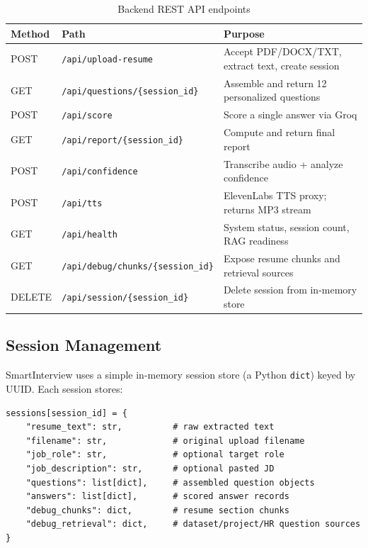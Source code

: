 \documentclass[12pt,a4paper]{article}
\begin{document}
\begin{table}[H]
\centering
\caption{Backend REST API endpoints}
\small
\begin{tabularx}{\textwidth}{l l X}
\toprule
\textbf{Method} & \textbf{Path} & \textbf{Purpose} \\
\midrule
POST & \texttt{/api/upload-resume} & Accept PDF/DOCX/TXT, extract text, create session \\
GET  & \texttt{/api/questions/\{session\_id\}} & Assemble and return 12 personalized questions \\
POST & \texttt{/api/score} & Score a single answer via Groq \\
GET  & \texttt{/api/report/\{session\_id\}} & Compute and return final report \\
POST & \texttt{/api/confidence} & Transcribe audio + analyze confidence \\
POST & \texttt{/api/tts} & ElevenLabs TTS proxy; returns MP3 stream \\
GET  & \texttt{/api/health} & System status, session count, RAG readiness \\
GET  & \texttt{/api/debug/chunks/\{session\_id\}} & Expose resume chunks and retrieval sources \\
DELETE & \texttt{/api/session/\{session\_id\}} & Delete session from in-memory store \\
\bottomrule
\end{tabularx}
\end{table}

\subsection{Session Management}

SmartInterview uses a simple in-memory session store (a Python \texttt{dict}) keyed by UUID. Each session stores:

\begin{lstlisting}[style=python, numbers=none]
sessions[session_id] = {
    "resume_text": str,          # raw extracted text
    "filename": str,             # original upload filename
    "job_role": str,             # optional target role
    "job_description": str,      # optional pasted JD
    "questions": list[dict],     # assembled question objects
    "answers": list[dict],       # scored answer records
    "debug_chunks": dict,        # resume section chunks
    "debug_retrieval": dict,     # dataset/project/HR question sources
}
\end{lstlisting}
\end{document}
